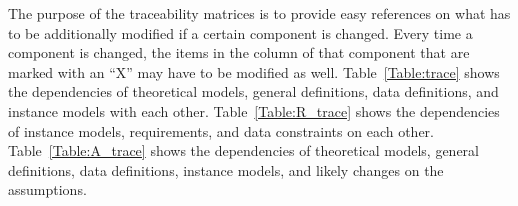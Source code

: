 \documentclass[12pt]{article}
\begin{document}
\plt
{
The purpose of the traceability matrices is to provide easy references on what
has to be additionally modified if a certain component is changed.  Every time a
component is changed, the items in the column of that component that are marked
with an ``X'' may have to be modified as well.  Table~\ref{Table:trace} shows the
dependencies of theoretical models, general definitions, data definitions, and
instance models with each other. Table~\ref{Table:R_trace} shows the
dependencies of instance models, requirements, and data constraints on each
other. Table~\ref{Table:A_trace} shows the dependencies of theoretical models,
general definitions, data definitions, instance models, and likely changes on
the assumptions.



}
\end{document}
